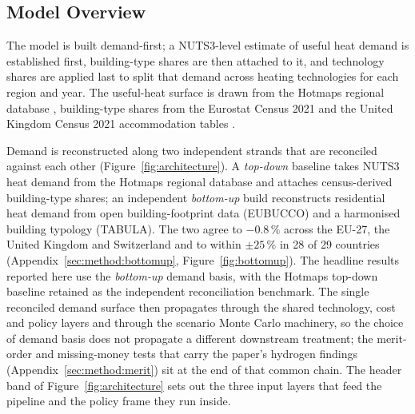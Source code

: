 %
\label{sec:method}

\subsection{Model Overview}
\label{sec:method:overview}

The model is built demand-first; a NUTS3-level estimate of useful heat demand is
established first, building-type shares are then attached to it, and technology
shares are applied last to split that demand across heating technologies for each
region and year. The useful-heat surface is drawn from the Hotmaps regional
database \citep{Hotmaps2020}, building-type shares from the Eurostat Census 2021
\citep{Eurostat2021census} and the United Kingdom Census 2021 accommodation tables
\citep{ONS2021TS044}.

Demand is reconstructed along two independent strands that are reconciled against
each other (Figure~\ref{fig:architecture}). A \emph{top-down} baseline takes NUTS3
heat demand from the Hotmaps regional database and attaches census-derived
building-type shares; an independent \emph{bottom-up} build reconstructs
residential heat demand from open building-footprint data (EUBUCCO) and a
harmonised building typology (TABULA). The two agree to $-0.8\,\%$ across the
EU-27, the United Kingdom and Switzerland and to within $\pm 25\,\%$ in 28 of 29 countries
(Appendix~\ref{sec:method:bottomup}, Figure~\ref{fig:bottomup}). The headline
results reported here use the \emph{bottom-up} demand basis, with the Hotmaps
top-down baseline retained as
the independent reconciliation benchmark. The single reconciled demand surface
then propagates through the shared technology, cost and policy layers and through
the scenario Monte Carlo machinery, so the choice of demand basis does not
propagate a different downstream treatment; the merit-order and missing-money
tests that carry the paper's hydrogen findings
(Appendix~\ref{sec:method:merit}) sit at the end of that common chain. The header band
of Figure~\ref{fig:architecture} sets out the three input layers that feed the pipeline
and the policy frame they run inside.

